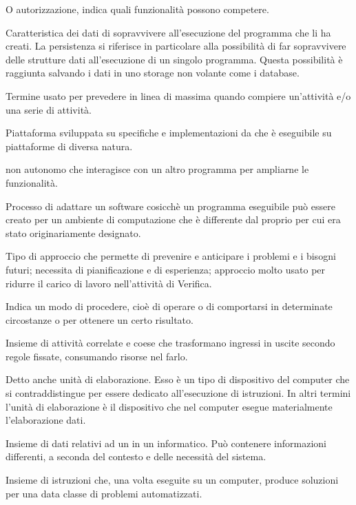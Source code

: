 {O autorizzazione, indica quali funzionalità possono competere.}

{Caratteristica dei dati di sopravvivere all'esecuzione del programma che li ha creati. La persistenza si riferisce in particolare alla possibilità di far sopravvivere delle strutture dati all'esecuzione di un singolo programma. Questa possibilità è raggiunta salvando i dati in uno storage non volante come i database.}

{Termine usato per prevedere in linea di massima quando compiere un'attività e/o una serie di attività.}

{Piattaforma  sviluppata su specifiche e implementazioni da  che è eseguibile su piattaforme  di diversa natura.}

{ non autonomo che interagisce con un altro programma per ampliarne le funzionalità.}

{Processo di adattare un software cosicchè un programma eseguibile può essere creato per un ambiente di computazione che è differente dal proprio per cui era stato originariamente designato.}

{Tipo di approccio che permette di prevenire e anticipare i problemi e i bisogni futuri; necessita di pianificazione e di esperienza; approccio molto usato per ridurre il carico di lavoro nell'attività di Verifica.}

{Indica un modo di procedere, cioè di operare o di comportarsi in determinate circostanze o per ottenere un certo risultato.}

{Insieme di attività correlate e coese che trasformano ingressi in uscite secondo regole fissate, consumando risorse nel farlo.}

{Detto anche unità di elaborazione. Esso è un tipo di dispositivo  del computer che si contraddistingue per essere dedicato all'esecuzione di istruzioni. In altri termini l'unità di elaborazione è il dispositivo che nel computer esegue materialmente l'elaborazione dati.}

{Insieme di dati relativi ad un  in un  informatico. Può contenere informazioni differenti, a seconda del contesto e delle necessità del sistema.}

{Insieme di istruzioni che, una volta eseguite su un computer, produce soluzioni per una data classe di problemi automatizzati.}

